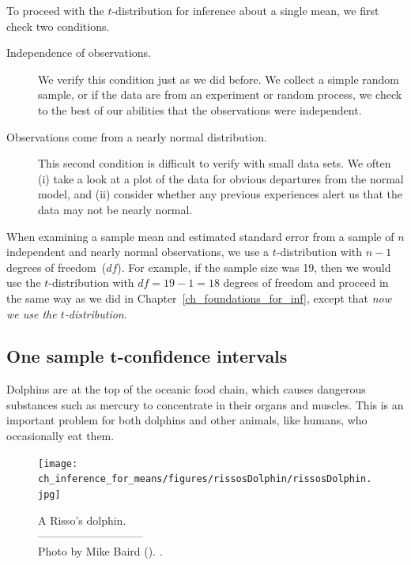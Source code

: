 \noindent%
To proceed with the $t$-distribution for inference about a single mean, we first check two conditions.
\begin{description}
\item[Independence of observations.]
    We verify this condition just as we did before.
    We collect a simple random sample, or if the data are from an experiment or random process, we check to the best of our abilities that the observations were independent.
\item[Observations come from a nearly normal distribution.]
    This second condition is difficult to verify with small data sets.
    We often (i) take a look at a plot of the data for obvious departures from the normal model, and (ii) consider whether any previous experiences alert us that the data may not be nearly normal.
\end{description}
When examining a sample mean and estimated standard error from a sample of $n$ independent and nearly normal observations, we use a $t$-distribution with $n-1$ degrees of freedom~($df$).
For example, if the sample size was 19, then we would use the $t$-distribution with $df=19-1=18$ degrees of freedom and proceed in the same way as we did in Chapter~\ref{ch_foundations_for_inf}, except that \emph{now we use the $t$-distribution}.


\subsection{One sample $\mathbf{t}$-confidence intervals}
\label{oneSampleTConfidenceIntervals}


Dolphins are at the top of the oceanic food chain, which causes dangerous substances such as mercury to concentrate in their organs and muscles. This is an important problem for both dolphins and other animals, like humans, who occasionally eat them.
\setlength{\captionwidth}{86mm}

\begin{figure}[h]
\centering
\texttt{[image: ch\_inference\_for\_means/figures/rissosDolphin/rissosDolphin.jpg]}  \\
\addvspace{2mm}
\begin{minipage}{\textwidth}
   \caption[rissosDolphinPic]{A Risso's dolphin.\vspace{-1mm} \\
   -----------------------------\vspace{-2mm}\\
   {\footnotesize Photo by Mike Baird (). .}\vspace{-8mm}}
   \label{rissosDolphin}
\end{minipage}
\stdvspace{}
\end{figure}
\setlength{\captionwidth}{\mycaptionwidth}

